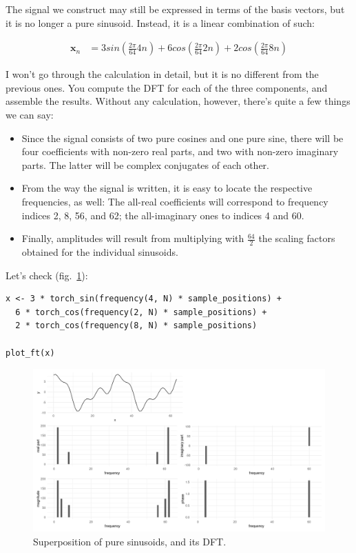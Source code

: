 \documentclass[
  letterpaper,
]{krantz}
\providecommand{\tightlist}{%
  \setlength{\itemsep}{0pt}\setlength{\parskip}{0pt}}\usepackage{longtable,booktabs,array}
\begin{document}
The signal we construct may still be expressed in terms of the basis
vectors, but it is no longer a pure sinusoid. Instead, it is a linear
combination of such:

\[
\begin{aligned}
\mathbf{x}_n &= 3 sin(\frac{2 \pi}{64} 4n) + 6 cos(\frac{2 \pi}{64} 2n) +2cos(\frac{2 \pi}{64} 8n)
\end{aligned}
\]

I won't go through the calculation in detail, but it is no different
from the previous ones. You compute the DFT for each of the three
components, and assemble the results. Without any calculation, however,
there's quite a few things we can say:

\begin{itemize}
\tightlist
\item
  Since the signal consists of two pure cosines and one pure sine, there
  will be four coefficients with non-zero real parts, and two with
  non-zero imaginary parts. The latter will be complex conjugates of
  each other.
\item
  From the way the signal is written, it is easy to locate the
  respective frequencies, as well: The all-real coefficients will
  correspond to frequency indices 2, 8, 56, and 62; the all-imaginary
  ones to indices 4 and 60.
\item
  Finally, amplitudes will result from multiplying with \(\frac{64}{2}\)
  the scaling factors obtained for the individual sinusoids.
\end{itemize}

Let's check (fig.~\ref{fig-dft-mix-of-sinuisoids}):

\begin{verbatim}
x <- 3 * torch_sin(frequency(4, N) * sample_positions) +
  6 * torch_cos(frequency(2, N) * sample_positions) +
  2 * torch_cos(frequency(8, N) * sample_positions)

plot_ft(x)
\end{verbatim}

\begin{figure}[H]

{\centering \includegraphics{images/dft-mix-of-sinuisoids.png}

}

\caption{\label{fig-dft-mix-of-sinuisoids}Superposition of pure
sinusoids, and its DFT.}

\end{figure}
\end{document}
